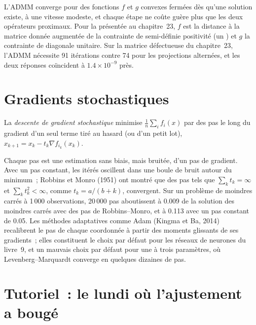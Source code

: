 L'ADMM converge pour des fonctions $f$ et $g$ convexes fermées dès qu'une solution existe, à une vitesse modeste, et chaque étape ne coûte guère plus que les deux opérateurs proximaux. Pour la  présentée au
chapitre~23, $f$ est la distance à la matrice donnée augmentée de la contrainte de semi-définie positivité (un ) et $g$ la contrainte de diagonale unitaire. Sur la matrice défectueuse du chapitre~23, l'ADMM nécessite 91
itérations contre 74 pour les projections alternées, et les deux réponses coïncident à $1.4 \times 10^{-9}$ près.

\section{Gradients stochastiques}

\begin{definition}\label{def:qm:numerical-optimisation-in-practice:sgd}
La \emph{descente de gradient stochastique} minimise $\frac1n\sum_if_i(x)$ par des pas le long du gradient d'un seul terme tiré au hasard (ou d'un petit lot),
$x_{k+1} = x_k - t_k\nabla f_{i_k}(x_k)$.
\end{definition}

Chaque pas est une estimation sans biais, mais bruitée, d'un pas de gradient. Avec un pas constant, les itérés oscillent dans une boule de bruit autour du minimum~; Robbins et Monro (1951) ont montré que des pas tels que
$\sum_kt_k = \infty$ et $\sum_kt_k^2 < \infty$, comme $t_k = a/(b + k)$, convergent. Sur un problème de moindres carrés à 1\,000 observations, 20\,000 pas aboutissent à 0.009 de la solution des moindres carrés
avec des pas de Robbins--Monro, et à 0.113 avec un pas constant de 0.05. Les méthodes adaptatives comme Adam (Kingma et Ba, 2014) recalibrent le pas de chaque coordonnée à partir des moments glissants de ses
gradients~; elles constituent le choix par défaut pour les réseaux de neurones du livre~9, et un mauvais choix par défaut pour une  à trois paramètres, où Levenberg--Marquardt converge en quelques dizaines de pas.

\section{Tutoriel~: le lundi où l'ajustement a bougé}\label{tut:qm:numerical-optimisation-in-practice:monday}

